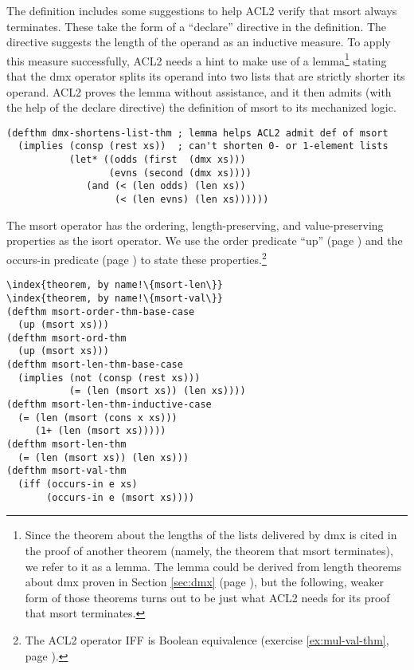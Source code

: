 The definition includes some suggestions
to help ACL2 verify that msort always terminates.
These take the form of a ``declare'' directive
in the definition.
The directive suggests the length of the operand as an inductive measure.
To apply this measure successfully,
ACL2 needs a hint to make use of a lemma\footnote{Since
the theorem about the lengths of the lists
delivered by dmx is cited in the proof of
another theorem (namely, the theorem that msort terminates),
we refer to it as a lemma.
The lemma could be derived from length theorems about dmx
proven in Section \ref{sec:dmx} (page \pageref{thm:dmx-length-first-second}),
but the following, weaker form of those theorems turns out to be just what
ACL2 needs for its proof that msort terminates.}
stating that the dmx operator splits its
operand into two lists that are strictly shorter its operand.
ACL2 proves the lemma without assistance,
and it then admits (with the help of the declare directive)
the definition of msort to its mechanized logic.

\label{defthm:dmx-shortens-list}
\begin{Verbatim}
(defthm dmx-shortens-list-thm ; lemma helps ACL2 admit def of msort
  (implies (consp (rest xs))  ; can't shorten 0- or 1-element lists
           (let* ((odds (first  (dmx xs)))
                  (evns (second (dmx xs))))
              (and (< (len odds) (len xs))
                   (< (len evns) (len xs))))))
\end{Verbatim}

The msort operator has the ordering, length-preserving,
and value-preserving properties as the isort operator.
We use the order predicate ``up'' (page \pageref{defun:up})
and the occurs-in predicate (page \pageref{def:occurs-in})
to state these properties.\footnote{The ACL2 operator
IFF is Boolean
equivalence
(exercise \ref{ex:mul-val-thm}, page \pageref{def:equivalence-op}).}

\label{defthm:msort-ord}
\label{defthm:msort-len}
\label{defthm:msort-val}
\begin{Verbatim}
\index{theorem, by name!\{msort-len\}}
\index{theorem, by name!\{msort-val\}}
(defthm msort-order-thm-base-case
  (up (msort xs)))
(defthm msort-ord-thm
  (up (msort xs)))
(defthm msort-len-thm-base-case
  (implies (not (consp (rest xs)))
           (= (len (msort xs)) (len xs))))
(defthm msort-len-thm-inductive-case
  (= (len (msort (cons x xs)))
     (1+ (len (msort xs)))))
(defthm msort-len-thm
  (= (len (msort xs)) (len xs)))
(defthm msort-val-thm
  (iff (occurs-in e xs)
       (occurs-in e (msort xs))))
\end{Verbatim}

